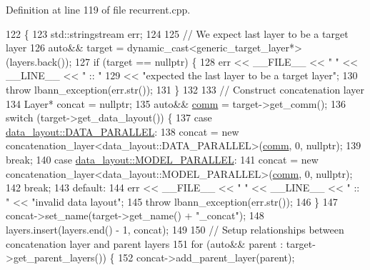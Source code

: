 Definition at line 119 of file recurrent.\+cpp.


\begin{DoxyCode}
122                                                                                  \{
123   std::stringstream err;
124 
125   \textcolor{comment}{// We expect last layer to be a target layer}
126   \textcolor{keyword}{auto}&& target = \textcolor{keyword}{dynamic\_cast<}generic\_target\_layer*\textcolor{keyword}{>}(layers.back());
127   \textcolor{keywordflow}{if} (target == \textcolor{keyword}{nullptr}) \{
128     err << \_\_FILE\_\_ << \textcolor{stringliteral}{" "} << \_\_LINE\_\_ << \textcolor{stringliteral}{" :: "}
129         << \textcolor{stringliteral}{"expected the last layer to be a target layer"};
130     \textcolor{keywordflow}{throw} lbann\_exception(err.str());
131   \}
132 
133   \textcolor{comment}{// Construct concatenation layer}
134   Layer* concat = \textcolor{keyword}{nullptr};
135   \textcolor{keyword}{auto}&& \hyperlink{file__io_8cpp_ab048c6f9fcbcfaa57ce68b00263dbebe}{comm} = target->get\_comm();
136   \textcolor{keywordflow}{switch} (target->get\_data\_layout()) \{
137   \textcolor{keywordflow}{case} \hyperlink{base_8hpp_a786677cbfb3f5677b4d84f3056eb08dba37d2a3465f7cbf4ab60f4e79944d0638}{data\_layout::DATA\_PARALLEL}:
138     concat = \textcolor{keyword}{new} concatenation\_layer<data\_layout::DATA\_PARALLEL>(\hyperlink{file__io_8cpp_ab048c6f9fcbcfaa57ce68b00263dbebe}{comm}, 0, \textcolor{keyword}{nullptr});
139     \textcolor{keywordflow}{break};
140   \textcolor{keywordflow}{case} \hyperlink{base_8hpp_a786677cbfb3f5677b4d84f3056eb08dbac94d7b0e44ab8bdcdad694a673cdeae0}{data\_layout::MODEL\_PARALLEL}:
141     concat = \textcolor{keyword}{new} concatenation\_layer<data\_layout::MODEL\_PARALLEL>(\hyperlink{file__io_8cpp_ab048c6f9fcbcfaa57ce68b00263dbebe}{comm}, 0, \textcolor{keyword}{nullptr});
142     \textcolor{keywordflow}{break};
143   \textcolor{keywordflow}{default}:
144     err << \_\_FILE\_\_ << \textcolor{stringliteral}{" "} << \_\_LINE\_\_ << \textcolor{stringliteral}{" :: "} << \textcolor{stringliteral}{"invalid data layout"};
145     \textcolor{keywordflow}{throw} lbann\_exception(err.str());
146   \}
147   concat->set\_name(target->get\_name() + \textcolor{stringliteral}{"\_concat"});
148   layers.insert(layers.end() - 1, concat);
149 
150   \textcolor{comment}{// Setup relationships between concatenation layer and parent layers}
151   \textcolor{keywordflow}{for} (\textcolor{keyword}{auto}&& parent : target->get\_parent\_layers()) \{
152     concat->add\_parent\_layer(parent);

\end{DoxyCode}
